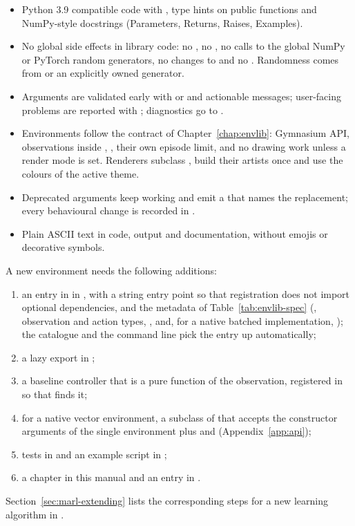 \begin{itemize}
  \item Python 3.9 compatible code with , type hints on public functions and NumPy-style docstrings
    (Parameters, Returns, Raises, Examples).
  \item No global side effects in library code: no , no
    , no calls to the global NumPy or PyTorch random
    generators, no changes to  and no
    . Randomness comes from  or an
    explicitly owned generator.
  \item Arguments are validated early with  or
     and actionable messages; user-facing problems are
    reported with ; diagnostics go to
    .
  \item Environments follow the contract of Chapter~\ref{chap:envlib}:
    Gymnasium API,  observations inside
    , , their own episode
    limit, and no drawing work unless a render mode is set. Renderers subclass
    , build their artists once and use
    the colours of the active theme.
  \item Deprecated arguments keep working and emit a
     that names the replacement; every behavioural
    change is recorded in .
  \item Plain ASCII text in code, output and documentation, without emojis or
    decorative symbols.
\end{itemize}

A new environment needs the following additions:
\begin{enumerate}
  \item an entry in  in ,
    with a string entry point so that registration does not import optional
    dependencies, and the metadata of Table~\ref{tab:envlib-spec}
    (, observation and action types, ,
     and, for a native batched implementation,
    ); the catalogue and the command line pick the
    entry up automatically;
  \item a lazy export in ;
  \item a baseline controller that is a pure function of the observation,
    registered in  so that
     finds it;
  \item for a native vector environment, a subclass of
     that accepts the constructor
    arguments of the single environment plus  and
     (Appendix~\ref{app:api});
  \item tests in  and an example script in
    ;
  \item a chapter in this manual and an entry in .
\end{enumerate}

Section~\ref{sec:marl-extending} lists the corresponding steps for a new
learning algorithm in .

\par\endgroup

